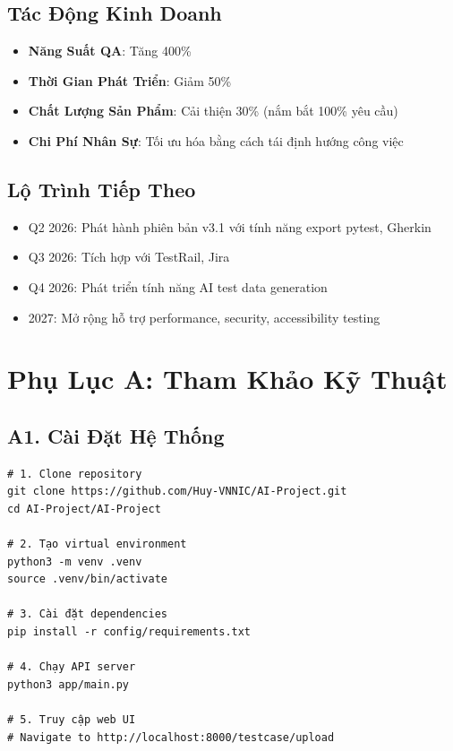 \documentclass[14pt,a4paper]{article}
\begin{document}
\subsection{Tác Động Kinh Doanh}

\begin{itemize}
    \item \textbf{Năng Suất QA}: Tăng 400\%
    \item \textbf{Thời Gian Phát Triển}: Giảm 50\%
    \item \textbf{Chất Lượng Sản Phẩm}: Cải thiện 30\% (nắm bắt 100\% yêu cầu)
    \item \textbf{Chi Phí Nhân Sự}: Tối ưu hóa bằng cách tái định hướng công việc
\end{itemize}

\subsection{Lộ Trình Tiếp Theo}

\begin{itemize}
    \item Q2 2026: Phát hành phiên bản v3.1 với tính năng export pytest, Gherkin
    \item Q3 2026: Tích hợp với TestRail, Jira
    \item Q4 2026: Phát triển tính năng AI test data generation
    \item 2027: Mở rộng hỗ trợ performance, security, accessibility testing
\end{itemize}

\newpage
\section*{Phụ Lục A: Tham Khảo Kỹ Thuật}

\subsection*{A1. Cài Đặt Hệ Thống}

\begin{lstlisting}
# 1. Clone repository
git clone https://github.com/Huy-VNNIC/AI-Project.git
cd AI-Project/AI-Project

# 2. Tạo virtual environment
python3 -m venv .venv
source .venv/bin/activate

# 3. Cài đặt dependencies
pip install -r config/requirements.txt

# 4. Chạy API server
python3 app/main.py

# 5. Truy cập web UI
# Navigate to http://localhost:8000/testcase/upload
\end{lstlisting}
\end{document}
